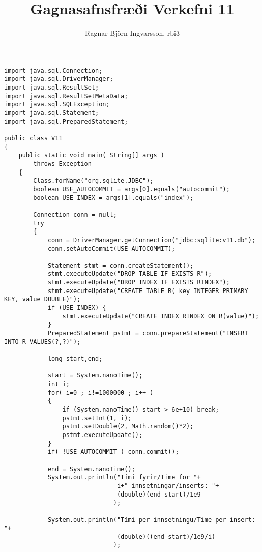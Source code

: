 \documentclass{article}
\title{Gagnasafnsfræði Verkefni 11}
\author{Ragnar Björn Ingvarsson, rbi3}
\begin{document}
\renewcommand\thepage{}

	\maketitle

	\newpage
	\setcounter{page}{1}
	\renewcommand\thepage{\arabic{page}}

	\section{}
	\begin{verbatim}
import java.sql.Connection;
import java.sql.DriverManager;
import java.sql.ResultSet;
import java.sql.ResultSetMetaData;
import java.sql.SQLException;
import java.sql.Statement;
import java.sql.PreparedStatement;

public class V11
{
    public static void main( String[] args )
        throws Exception
    {
        Class.forName("org.sqlite.JDBC");
        boolean USE_AUTOCOMMIT = args[0].equals("autocommit");
        boolean USE_INDEX = args[1].equals("index");
    
        Connection conn = null;
        try
        {
            conn = DriverManager.getConnection("jdbc:sqlite:v11.db");
            conn.setAutoCommit(USE_AUTOCOMMIT);

			Statement stmt = conn.createStatement();
			stmt.executeUpdate("DROP TABLE IF EXISTS R");
			stmt.executeUpdate("DROP INDEX IF EXISTS RINDEX");
			stmt.executeUpdate("CREATE TABLE R( key INTEGER PRIMARY KEY, value DOUBLE)");
			if (USE_INDEX) {
				stmt.executeUpdate("CREATE INDEX RINDEX ON R(value)");
			}
			PreparedStatement pstmt = conn.prepareStatement("INSERT INTO R VALUES(?,?)");

            long start,end;

            start = System.nanoTime();
            int i;
            for( i=0 ; i!=1000000 ; i++ )
            {
				if (System.nanoTime()-start > 6e+10) break;
				pstmt.setInt(1, i);
				pstmt.setDouble(2, Math.random()*2);
				pstmt.executeUpdate();
            }
            if( !USE_AUTOCOMMIT ) conn.commit();

            end = System.nanoTime();
            System.out.println("Tími fyrir/Time for "+
                               i+" innsetningar/inserts: "+
                               (double)(end-start)/1e9
                              );

            System.out.println("Tími per innsetningu/Time per insert: "+
                               (double)((end-start)/1e9/i)
                              );


\end{verbatim}
\end{document}
